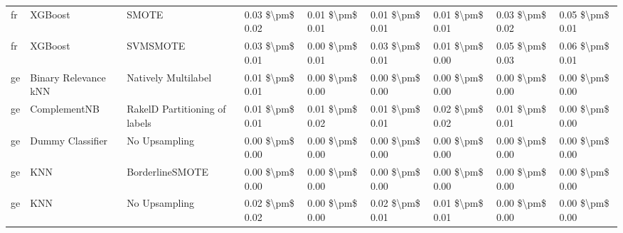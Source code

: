 \begin{tabular}{lllllllll}
      fr &                         XGBoost &                         SMOTE & 0.03 \$\textbackslash pm\$ 0.02 &           0.01 \$\textbackslash pm\$ 0.01 &       0.01 \$\textbackslash pm\$ 0.01 &        0.01 \$\textbackslash pm\$ 0.01 &                         0.03 \$\textbackslash pm\$ 0.02 &     0.05 \$\textbackslash pm\$ 0.01 \\
      fr &                         XGBoost &                      SVMSMOTE & 0.03 \$\textbackslash pm\$ 0.01 &           0.00 \$\textbackslash pm\$ 0.01 &       0.03 \$\textbackslash pm\$ 0.01 &        0.01 \$\textbackslash pm\$ 0.00 &                         0.05 \$\textbackslash pm\$ 0.03 &     0.06 \$\textbackslash pm\$ 0.01 \\
      ge &            Binary Relevance kNN &           Natively Multilabel & 0.01 \$\textbackslash pm\$ 0.01 &           0.00 \$\textbackslash pm\$ 0.00 &       0.00 \$\textbackslash pm\$ 0.00 &        0.00 \$\textbackslash pm\$ 0.00 &                         0.00 \$\textbackslash pm\$ 0.00 &     0.00 \$\textbackslash pm\$ 0.00 \\
      ge &                    ComplementNB & RakelD Partitioning of labels & 0.01 \$\textbackslash pm\$ 0.01 &           0.01 \$\textbackslash pm\$ 0.02 &       0.01 \$\textbackslash pm\$ 0.01 &        0.02 \$\textbackslash pm\$ 0.02 &                         0.01 \$\textbackslash pm\$ 0.01 &     0.00 \$\textbackslash pm\$ 0.00 \\
      ge &                Dummy Classifier &                 No Upsampling & 0.00 \$\textbackslash pm\$ 0.00 &           0.00 \$\textbackslash pm\$ 0.00 &       0.00 \$\textbackslash pm\$ 0.00 &        0.00 \$\textbackslash pm\$ 0.00 &                         0.00 \$\textbackslash pm\$ 0.00 &     0.00 \$\textbackslash pm\$ 0.00 \\
      ge &                             KNN &               BorderlineSMOTE & 0.00 \$\textbackslash pm\$ 0.00 &           0.00 \$\textbackslash pm\$ 0.00 &       0.00 \$\textbackslash pm\$ 0.00 &        0.00 \$\textbackslash pm\$ 0.00 &                         0.00 \$\textbackslash pm\$ 0.00 &     0.00 \$\textbackslash pm\$ 0.00 \\
      ge &                             KNN &                 No Upsampling & 0.02 \$\textbackslash pm\$ 0.02 &           0.00 \$\textbackslash pm\$ 0.00 &       0.02 \$\textbackslash pm\$ 0.01 &        0.01 \$\textbackslash pm\$ 0.01 &                         0.00 \$\textbackslash pm\$ 0.00 &     0.00 \$\textbackslash pm\$ 0.00 \\

\end{tabular}
